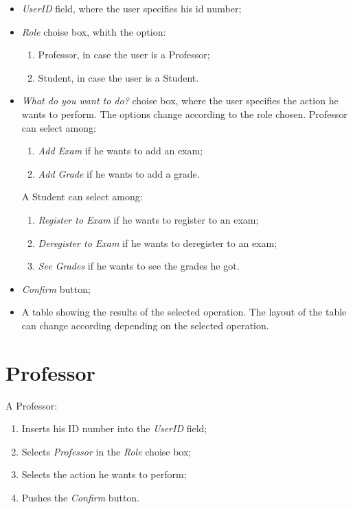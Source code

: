 \documentclass{report}
\begin{document}
\begin{itemize}
	\item \textit{UserID} field, where the user specifies his id number;
	\item \textit{Role} choise box, whith the option:
	\begin{enumerate}
		\item Professor, in case the user is a Professor;
		\item Student, in case the user is a Student.
	\end{enumerate} 
	\item \textit{What do you want to do?} choise box, where the user specifies the action he wants to perform. The options change according to the role chosen.
	Professor can select among:
	\begin{enumerate}
		\item \textit{Add Exam} if he wants to add an exam;
		\item \textit{Add Grade} if he wants to add a grade.
	\end{enumerate}
	A Student can select among:
	\begin{enumerate}
		\item \textit{Register to Exam} if he wants to register to an exam;
		\item \textit{Deregister to Exam} if he wants to deregister to an exam;
		\item \textit{See Grades} if he wants to see the grades he got.
	\end{enumerate}
	\item \textit{Confirm} button;
	\item A table showing the results of the selected operation. The layout of the table can change according depending on the selected operation.
\end{itemize}
\section*{Professor}
A Professor:
\begin{enumerate}
	\item Inserts his ID number into the \textit{UserID} field;
	\item Selects \textsl{Professor} in the \textit{Role} choise box;
	\item Selects the action he wants to perform;
	\item Pushes the \textit{Confirm} button.
\end{enumerate}
\end{document}
